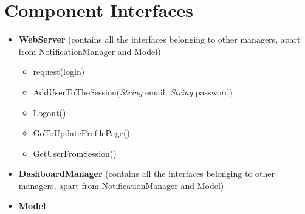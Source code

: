 \section{Component Interfaces}
\label{sec:component_interfaces}%
\begin{itemize}
    \item \textbf{\textbf{WebServer} }(contains all the interfaces belonging to other managers, apart from NotificationManager and Model)
    \begin{itemize}

\item request(login)
\item AddUserToTheSession(\textit{String} email, \textit{String} password)
\item Logout()
\item GoToUpdateProfilePage()
\item GetUserFromSession()

\end{itemize}

    \item \textbf{\textbf{DashboardManager}} (contains all the interfaces belonging to other managers, apart from NotificationManager and Model)

    \item \textbf{\textbf{Model}}
    \begin{itemize}


\end{itemize}
\end{itemize}

